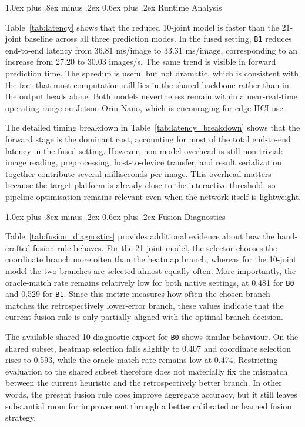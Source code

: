 \documentclass[10pt,letterpaper,twocolumn]{article}
\makeatletter
\renewcommand\subsection{\@startsection{subsection}{2}{\z@}%
  {1.0ex plus .8ex minus .2ex}%
  {0.6ex plus .2ex}%
  {\normalfont\itshape}}
\makeatother
\begin{document}
\subsection{Runtime Analysis}

Table~\ref{tab:latency} shows that the reduced 10-joint model is faster than the 21-joint baseline across all three prediction modes. In the fused setting, \texttt{B1} reduces end-to-end latency from 36.81 ms/image to 33.31 ms/image, corresponding to an increase from 27.20 to 30.03 images/s. The same trend is visible in forward prediction time. The speedup is useful but not dramatic, which is consistent with the fact that most computation still lies in the shared backbone rather than in the output heads alone. Both models nevertheless remain within a near-real-time operating range on Jetson Orin Nano, which is encouraging for edge HCI use.

The detailed timing breakdown in Table~\ref{tab:latency_breakdown} shows that the forward stage is the dominant cost, accounting for most of the total end-to-end latency in the fused setting. However, non-model overhead is still non-trivial: image reading, preprocessing, host-to-device transfer, and result serialization together contribute several milliseconds per image. This overhead matters because the target platform is already close to the interactive threshold, so pipeline optimisation remains relevant even when the network itself is lightweight.

\subsection{Fusion Diagnostics}

Table~\ref{tab:fusion_diagnostics} provides additional evidence about how the hand-crafted fusion rule behaves. For the 21-joint model, the selector chooses the coordinate branch more often than the heatmap branch, whereas for the 10-joint model the two branches are selected almost equally often. More importantly, the oracle-match rate remains relatively low for both native settings, at 0.481 for \texttt{B0} and 0.529 for \texttt{B1}. Since this metric measures how often the chosen branch matches the retrospectively lower-error branch, these values indicate that the current fusion rule is only partially aligned with the optimal branch decision.

The available shared-10 diagnostic export for \texttt{B0} shows similar behaviour. On the shared subset, heatmap selection falls slightly to 0.407 and coordinate selection rises to 0.593, while the oracle-match rate remains low at 0.474. Restricting evaluation to the shared subset therefore does not materially fix the mismatch between the current heuristic and the retrospectively better branch. In other words, the present fusion rule does improve aggregate accuracy, but it still leaves substantial room for improvement through a better calibrated or learned fusion strategy.
\end{document}
